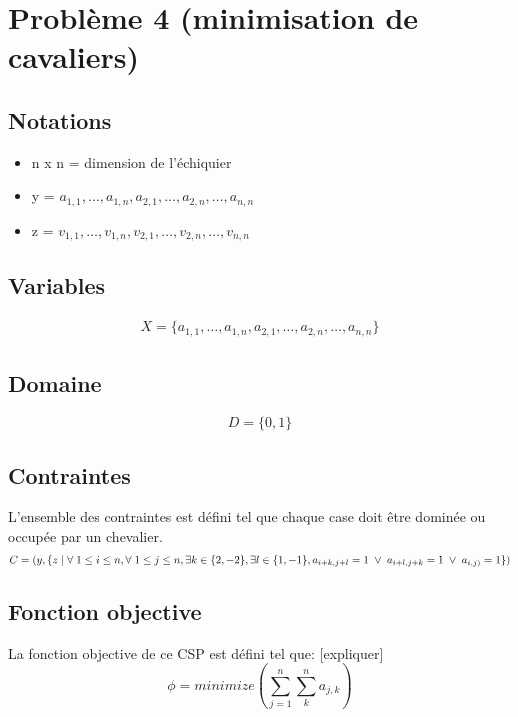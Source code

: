 \documentclass[a4paper,11pt]{article}
\begin{document}
\section{Problème 4 (minimisation de cavaliers)}
\subsection{Notations}
\begin{itemize}
\item n x n = dimension de l'échiquier
\item y = $a_{1,1},\ldots, a_{1,n},a_{2,1}, \ldots,a_{2,n}, \ldots, a_{n,n} $
\item z = $v_{1,1},\ldots, v_{1,n},v_{2,1}, \ldots,v_{2,n}, \ldots, v_{n,n} $
\end{itemize}

\subsection{Variables}
\begin{equation}
  \begin{split}
    X = \{a_{1,1},\ldots, a_{1,n},a_{2,1}, \ldots,a_{2,n}, \ldots, a_{n,n} \}
  \end{split}
\end{equation}

\subsection{Domaine}
$$D = \{ 0, 1 \}$$

\subsection{Contraintes}
L'ensemble des contraintes est défini tel que chaque case doit être dominée ou occupée par un chevalier. 
  $$ C = (y, \{z \hspace{0.1cm} | \hspace{0.1cm} \forall \hspace{0.1cm} 1 \leq i \leq n, \forall \hspace{0.1cm} 1 \leq j \leq n, \exists k \in \{2,-2\}, \exists l \in \{1,-1\}, a_{i+k,j+l}=1 \hspace{0.1cm} \vee \hspace{0.1cm} a_{i+l,j+k}=1 \hspace{0.1cm} \vee \hspace{0.1cm} a_{i,j)} = 1\}) $$ 

\subsection{Fonction objective}

La fonction objective de ce CSP est défini tel que: [expliquer]
  $$ \phi = minimize(\sum_{j=1}^{n} \sum_{k}^n a_{j,k}) $$
  
\end{document}
